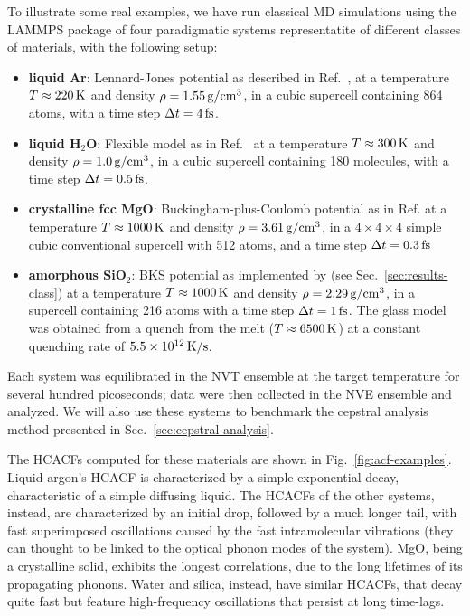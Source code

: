 \begin{LEtext}
To illustrate some real examples, we have run classical MD simulations using the \textsc{LAMMPS} package \cite{LAMMPS1995} of four paradigmatic systems representatite of different classes of materials, with the following setup:
\begin{itemize}
    \item \textbf{liquid Ar}: Lennard-Jones potential as described in Ref.~\cite{Argon-FF}, at a temperature $T\approx 220\,\mathrm{K}$ and density $\rho=1.55\,\mathrm{g/cm^3}$, in a cubic supercell containing 864 atoms, with a time step $\Delta t=4\,\mathrm{fs}$.
    \item \textbf{liquid H$_2$O}: Flexible model as in Ref.~\cite{Water-FF} at a temperature $T\approx 300\,\mathrm{K}$ and density $\rho=1.0\,\mathrm{g/cm^3}$, in a cubic supercell containing 180 molecules, with a time step $\Delta t=0.5\,\mathrm{fs}$.
    \item \textbf{crystalline fcc MgO}: Buckingham-plus-Coulomb potential as in Ref. \cite{MgO-FF} at a temperature $T\approx 1000\,\mathrm{K}$ and density $\rho=3.61\,\mathrm{g/cm^3}$, in a $4\times 4\times 4$ simple cubic conventional supercell with 512 atoms, and a time step $\Delta t=0.3\,\mathrm{fs}$
    \item \textbf{amorphous SiO$_2$}: BKS potential \cite{Silica-BKS-1990} as implemented by \citet{Mantisi2012} (see Sec.~\ref{sec:results-class}) at a temperature $T\approx 1000\,\mathrm{K}$ and density $\rho=2.29\,\mathrm{g/cm^3}$,  in a supercell containing 216 atoms with a time step $\Delta t=1\,\mathrm{fs}$. The glass model was obtained from a quench from the melt ($T\approx 6500\,\mathrm{K}$) at a constant quenching rate of $5.5\times 10^{12}\,\mathrm{K/s}$.
\end{itemize}
Each system was equilibrated in the NVT ensemble at the target temperature for several hundred picoseconds; data were then collected in the NVE ensemble and analyzed. 
We will also use these systems to benchmark the cepstral analysis method presented in Sec.~\ref{sec:cepstral-analysis}. 

The HCACFs computed for these materials are shown in Fig.~\ref{fig:acf-examples}. 
Liquid argon's HCACF is characterized by a simple exponential decay, characteristic of a simple diffusing liquid. The HCACFs of the other systems, instead, are characterized by an initial drop, followed by a much longer tail, with fast superimposed oscillations caused by the fast intramolecular vibrations (they can thought to be linked to the optical phonon modes of the system). MgO, being a crystalline solid, exhibits the longest correlations, due to the long lifetimes of its propagating phonons. Water and silica, instead, have similar HCACFs, that decay quite fast but feature high-frequency oscillations that persist at long time-lags.


\end{LEtext}
